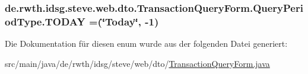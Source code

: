 \hypertarget{enumde_1_1rwth_1_1idsg_1_1steve_1_1web_1_1dto_1_1_transaction_query_form_1_1_query_period_type_a97a4405bd89967a0d79884a95c3242da}{
\subsubsection[{T\-O\-D\-A\-Y}]{\setlength{\rightskip}{0pt plus 5cm}de.\-rwth.\-idsg.\-steve.\-web.\-dto.\-Transaction\-Query\-Form.\-Query\-Period\-Type.\-T\-O\-D\-A\-Y =(\char`\"{}Today\char`\"{}, -\/1)}}\label{enumde_1_1rwth_1_1idsg_1_1steve_1_1web_1_1dto_1_1_transaction_query_form_1_1_query_period_type_a97a4405bd89967a0d79884a95c3242da}


Die Dokumentation für diesen enum wurde aus der folgenden Datei generiert\-:\begin{DoxyCompactItemize}
\item 
src/main/java/de/rwth/idsg/steve/web/dto/\hyperlink{_transaction_query_form_8java}{Transaction\-Query\-Form.\-java}\end{DoxyCompactItemize}
